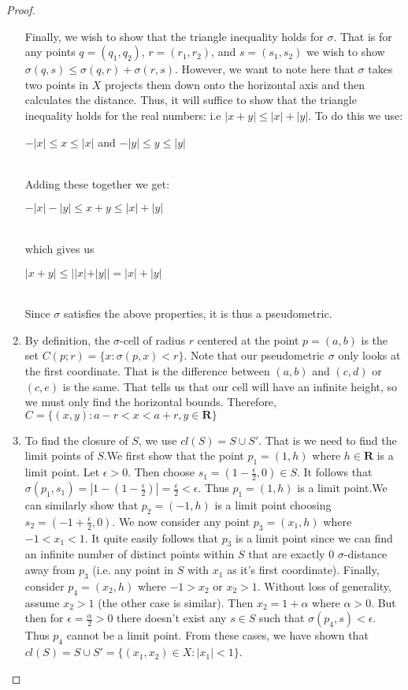 \begin{proof}
\begin{enumerate}
    Finally, we wish to show that the triangle inequality holds for $\sigma$. That is for any points $q=(q_1,q_2)$, $r=(r_1,r_2)$, and $s=(s_1,s_2)$ we wish to show $\sigma(q,s)\leq\sigma(q,r)+\sigma(r,s)$. However, we want to note here that $\sigma$ takes two points in $X$ projects them down onto the horizontal axis and then calculates the distance. Thus, it will suffice to show that the triangle inequality holds for the real numbers: i.e $|x+y|\leq|x|+|y|$. To do this we use:\\ \centerline{$-|x|\leq x\leq|x|$ and $-|y|\leq y\leq|y|$} \\ Adding these together we get: \\ \centerline{$-|x|-|y|\leq x+y\leq|x|+|y|$} \\ which gives us \\  \centerline{$|x+y|\leq||x|+|y||=|x|+|y|$} \\  Since $\sigma$ satisfies the above properties, it is thus a pseudometric.
    \item By definition, the $\sigma$-cell of radius $r$ centered at the point $p=(a,b)$ is the set $C(p;r)=\{x:\sigma(p,x)<r\}$. Note that our pseudometric $\sigma$ only looks at the first coordinate. That is the difference between $(a,b)$ and $(c,d)$ or $(c,e)$ is the same. That tells us that our cell will have an infinite height, so we must only find the horizontal bounds. Therefore, $C=\{(x,y):a-r<x<a+r, y\in \mathbf{R}\}$
    \item To find the closure of $S$, we use $cl(S)=S\cup S'$. That is we need to find the limit points of $S$.\newline We first show that the point $p_1=(1,h)$ where $h\in \mathbf{R}$ is a limit point. Let $\epsilon >0$. Then choose $s_1=(1-\frac{\epsilon}{2},0)\in S$. It follows that $\sigma(p_1,s_1)=|1-(1-\frac{\epsilon}{2})|=\frac{\epsilon}{2}<\epsilon$. Thus $p_1=(1,h)$ is a limit point.\newline \newline We can similarly show that $p_2=(-1,h)$ is a limit point choosing $s_2=(-1+\frac{\epsilon}{2},0)$. \newline We now consider any point $p_3=(x_1,h)$ where $-1<x_1<1$. It quite easily follows that $p_3$ is a limit point since we can find an infinite number of distinct points within $S$ that are exactly $0$ $\sigma$-distance away from $p_3$ (i.e. any point in $S$ with $x_1$ as it's first coordinate). \newline Finally, consider $p_4=(x_2,h)$ where $-1>x_2$ or $x_2>1$. Without loss of generality, assume $x_2>1$ (the other case is similar). Then $x_2=1+\alpha$ where $\alpha>0$. But then for $\epsilon=\frac{\alpha}{2}>0$ there doesn't exist any $s \in S$ such that $\sigma(p_4,s)<\epsilon$. Thus $p_4$ cannot be a limit point. From these cases, we have shown that $cl(S)=S\cup S'=\{(x_1,x_2)\in X:|x_1|<1\}$.
\end{enumerate}
\end{proof}
	
